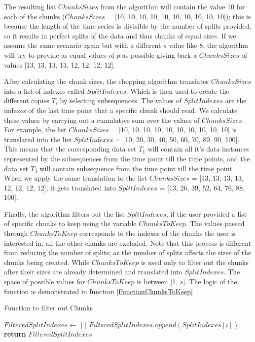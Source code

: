 The resulting list $ChunksSizes$ from the algorithm will contain the value 10 for each of the chunks ($ChunksSizes$ = [10, 10, 10, 10, 10, 10, 10, 10, 10, 10]);
this is because the length of the time series is divisible by the number of splits provided, so it results in perfect splits of the data and thus chunks of equal sizes.
If we assume the same scenario again but with a different $s$ value like 8, the algorithm will try to provide as equal values of $p$ as possible
giving back a $ChunksSizes$ of values [13, 13, 13, 13, 12, 12, 12, 12].

After calculating the chunk sizes, the chopping algorithm translates $ChunksSizes$ into a list of indexes called $SplitIndexes$.
Which is then used to create the different copies $T_{i}$ by selecting subsequences.
The values of $SplitIndexes$ are the indexes of the last time point that a specific chunk should read.
We calculate these values by carrying out a cumulative sum over the values of $ChunksSizes$.
For example, the list $ChunksSizes$ = [10, 10, 10, 10, 10, 10, 10, 10, 10, 10] is translated into the list $SplitIndexes$ = [10, 20, 30, 40, 50, 60, 70, 80, 90, 100].
This means that the corresponding data set $T_{1}$ will contain all it's data instances represented by the subsequences from the  time point till the  time points,
and the data set $T_{3}$ will contain subsequence from the  time point till the  time point.
When we apply the same translation to the list $ChunksSizes$ = [13, 13, 13, 13, 12, 12, 12, 12], it gets translated into $SplitIndexes$ = [13, 26, 39, 52, 64, 76, 88, 100].

Finally, the algorithm filters out the list $SplitIndexes$, if the user provided a list of specific chunks to keep using the variable $ChunksToKeep$.
The values passed through $ChunksToKeep$ corresponds to the indexes of the chunks the user is interested in, all the other chunks are excluded.
Note that this process is different from reducing the number of splits; as the number of splits affects the sizes of the chunks being created.
While $ChunksToKeep$ is used only to filter out the chunks after their sizes are already determined and translated into $SplitIndexes$.
The space of possible values for $ChunksToKeep$ is between [1, $s$]. The logic of the function is demonstrated in function \ref{FunctionChunksToKeep}

\begin{algorithm}
    \caption{Function to filter out Chunks}\label{FunctionChunksToKeep}
    \begin{algorithmic}[1]
      \State $FilteredSplitIndexes \gets$ [ ]
                \State $FilteredSplitIndexes.append(SplitIndexes[i])$
        \EndFor
        \State \textbf{return} $FilteredSplitIndexes$
      \EndFunction
    \end{algorithmic}
\end{algorithm}

